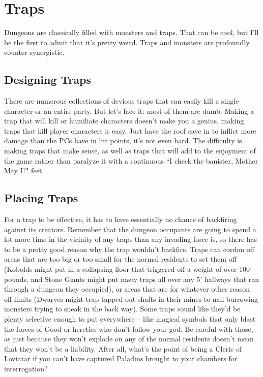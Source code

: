\section{Traps}
\vspace*{-8pt}

Dungeons are classically filled with monsters and traps. That can be cool, but I'll be the first to admit that it's pretty weird. Traps and monsters are profoundly counter synergistic.

\subsection{Designing Traps}

There are numerous collections of devious traps that can easily kill a single character or an entire party. But let's face it: most of them are dumb. Making a trap that will kill or humiliate characters doesn't make you a genius, making traps that kill player characters is easy. Just have the roof cave in to inflict more damage than the PCs have in hit points, it's not even hard. The difficulty is making traps that make sense, as well as traps that will add to the enjoyment of the game rather than paralyze it with a continuous ``I check the banister, Mother May I?" fest.

\subsection{Placing Traps}

For a trap to be effective, it has to have essentially no chance of backfiring against its creators. Remember that the dungeon occupants are going to spend a lot more time in the vicinity of any traps than any invading force is, so there has to be a pretty good reason why the trap wouldn't backfire. Traps can cordon off areas that are too big or too small for the normal residents to set them off (Kobolds might put in a collapsing floor that triggered off a weight of over 100 pounds, and Stone Giants might put nasty traps all over any 5' hallways that ran through a dungeon they occupied), or areas that are for whatever other reason off-limits (Dwarves might trap tapped-out shafts in their mines to nail burrowing monsters trying to sneak in the back way). Some traps sound like they'd be plenty selective enough to put everywhere -- like magical symbols that only blast the forces of Good or heretics who don't follow your god. Be careful with those, as just because they won't explode on any of the normal residents doesn't mean that they won't be a liability. After all, what's the point of being a Cleric of Loviatar if you can't have captured Paladins brought to your chambers for interrogation?

